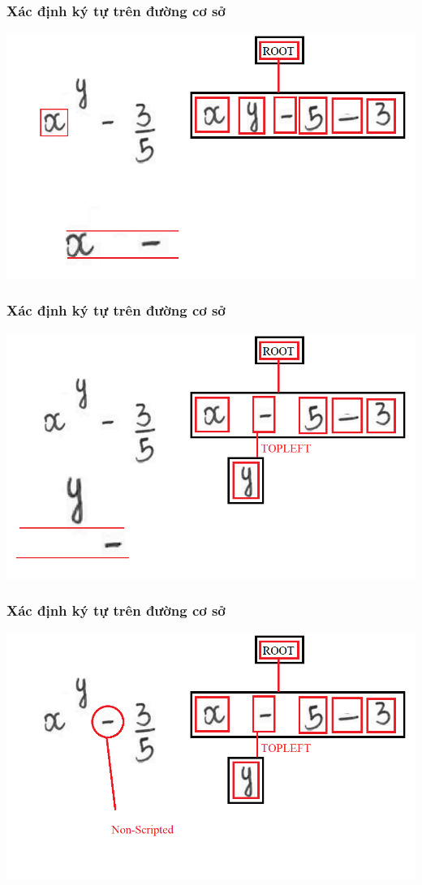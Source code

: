 \documentclass{beamer}
\begin{document}
\begin{frame}
	\frametitle{Xác định ký tự trên đường cơ sở}
	\begin{center}
		\centering
		\includegraphics[width=0.6\linewidth]{hor3.png}
	\end{center}
\end{frame}

\begin{frame}
	\frametitle{Xác định ký tự trên đường cơ sở}
	\begin{center}
		\centering
		\includegraphics[width=0.6\linewidth]{hor4.png}
	\end{center}
\end{frame}

\begin{frame}
	\frametitle{Xác định ký tự trên đường cơ sở}
	\begin{center}
		\centering
		\includegraphics[width=0.6\linewidth]{hor5.png}
	\end{center}
\end{frame}
\end{document}
